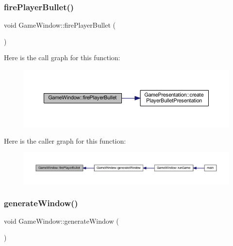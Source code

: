 \subsubsection{\texorpdfstring{fire\+Player\+Bullet()}{firePlayerBullet()}}
{\footnotesize\ttfamily void Game\+Window\+::fire\+Player\+Bullet (\begin{DoxyParamCaption}{ }\end{DoxyParamCaption})}

Here is the call graph for this function\+:\nopagebreak
\begin{figure}[H]
\begin{center}
\leavevmode
\includegraphics[width=350pt]{class_game_window_a119f405a2ff052c74d902c5b02bf0f05_cgraph}
\end{center}
\end{figure}
Here is the caller graph for this function\+:\nopagebreak
\begin{figure}[H]
\begin{center}
\leavevmode
\includegraphics[width=350pt]{class_game_window_a119f405a2ff052c74d902c5b02bf0f05_icgraph}
\end{center}
\end{figure}
\mbox{\label{class_game_window_a43f64127a3b8836405f80242c1e997f4}} 
\subsubsection{\texorpdfstring{generate\+Window()}{generateWindow()}}
{\footnotesize\ttfamily void Game\+Window\+::generate\+Window (\begin{DoxyParamCaption}{ }\end{DoxyParamCaption})}

